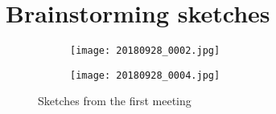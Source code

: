 \chapter{Brainstorming sketches}
\label{ch:notes}

\begin{figure}
    \centering
    \begin{subfigure}{0.4\textwidth}
        \centering
        \texttt{[image: 20180928\_0002.jpg]}
    \end{subfigure}
    \hspace{0.05\textwidth}
    \begin{subfigure}{0.4\textwidth}
        \centering
        \texttt{[image: 20180928\_0004.jpg]}
    \end{subfigure}
    \caption{Sketches from the first meeting}
    \label{fig:sketch-meeting}
\end{figure}
